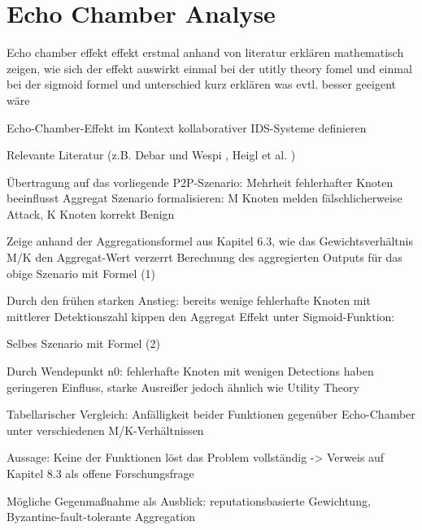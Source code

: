\section{Echo Chamber Analyse}



Echo chamber effekt
effekt erstmal anhand von literatur erklären mathematisch zeigen, wie sich der effekt auswirkt einmal bei der utitly theory fomel und einmal bei der sigmoid formel und unterschied kurz erklären was evtl. besser geeigent wäre 


Echo-Chamber-Effekt im Kontext kollaborativer IDS-Systeme definieren

Relevante Literatur (z.B. Debar und Wespi , Heigl et al. )

Übertragung auf das vorliegende P2P-Szenario: Mehrheit fehlerhafter Knoten beeinflusst Aggregat
Szenario formalisieren: M Knoten melden fälschlicherweise Attack, K Knoten korrekt Benign

Zeige anhand der Aggregationsformel aus Kapitel 6.3, wie das Gewichtsverhältnis M/K den Aggregat-Wert verzerrt
Berechnung des aggregierten Outputs für das obige Szenario mit Formel (1)

Durch den frühen starken Anstieg: bereits wenige fehlerhafte Knoten mit mittlerer Detektionszahl kippen den Aggregat
Effekt unter Sigmoid-Funktion:

Selbes Szenario mit Formel (2)

Durch Wendepunkt n0: fehlerhafte Knoten mit wenigen Detections haben geringeren Einfluss, starke Ausreißer jedoch ähnlich wie Utility Theory

Tabellarischer Vergleich: Anfälligkeit beider Funktionen gegenüber Echo-Chamber unter verschiedenen M/K-Verhältnissen

Aussage: Keine der Funktionen löst das Problem vollständig -> Verweis auf Kapitel 8.3 als offene Forschungsfrage

Mögliche Gegenmaßnahme als Ausblick: reputationsbasierte Gewichtung, Byzantine-fault-tolerante Aggregation